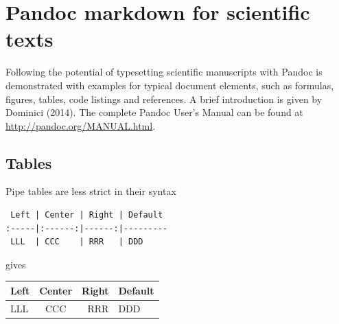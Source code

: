 \documentclass[10pt,fleqn]{wlpeerj}
\begin{document}
\section{Pandoc
markdown
for
scientific
texts}\label{pandoc-markdown-for-scientific-texts}

Following
the
potential
of
typesetting
scientific
manuscripts
with
Pandoc
is
demonstrated
with
examples
for
typical
document
elements,
such
as
formulas,
figures,
tables,
code
listings
and
references.
A
brief
introduction
is
given
by
Dominici
(2014).
The
complete
Pandoc
User's
Manual
can
be
found
at
\url{http://pandoc.org/MANUAL.html}.

\subsection{Tables}\label{tables}

Pipe
tables
are
less
strict
in
their
syntax

\begin{verbatim}
 Left | Center | Right | Default
:-----|:------:|------:|---------
 LLL  | CCC    | RRR   | DDD     
\end{verbatim}

gives

\begin{longtable}[]{@{}lcrl@{}}
\toprule
\begin{minipage}[b]{0.17\columnwidth}\raggedright\strut
Left\strut
\end{minipage}
&
\begin{minipage}[b]{0.24\columnwidth}\centering\strut
Center\strut
\end{minipage}
&
\begin{minipage}[b]{0.20\columnwidth}\raggedleft\strut
Right\strut
\end{minipage}
&
\begin{minipage}[b]{0.27\columnwidth}\raggedright\strut
Default\strut
\end{minipage}\tabularnewline
\midrule
\endhead
\begin{minipage}[t]{0.17\columnwidth}\raggedright\strut
LLL\strut
\end{minipage}
&
\begin{minipage}[t]{0.24\columnwidth}\centering\strut
CCC\strut
\end{minipage}
&
\begin{minipage}[t]{0.20\columnwidth}\raggedleft\strut
RRR\strut
\end{minipage}
&
\begin{minipage}[t]{0.27\columnwidth}\raggedright\strut
DDD\strut
\end{minipage}\tabularnewline
\bottomrule
\end{longtable}
\end{document}
